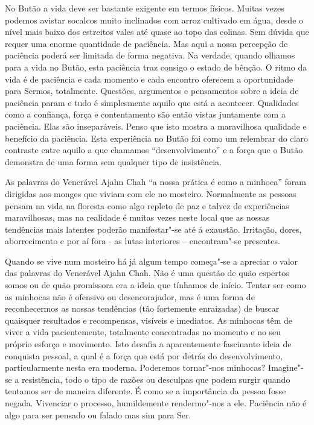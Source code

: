 No Butão a vida deve ser bastante exigente em termos físicos. Muitas
vezes podemos avistar socalcos muito inclinados com arroz cultivado em
água, desde o nível mais baixo dos estreitos vales até quase ao topo das
colinas. Sem dúvida que requer uma enorme quantidade de paciência. Mas
aqui a nossa percepção de paciência poderá ser limitada de forma
negativa. Na verdade, quando olhamos para a vida no Butão, esta
paciência traz consigo o estado de bênção. O ritmo da vida é de
paciência e cada momento e cada encontro oferecem a oportunidade para
Sermos, totalmente. Questões, argumentos e pensamentos sobre a ideia de
paciência param e tudo é simplesmente aquilo que está a acontecer.
Qualidades como a confiança, força e contentamento são então vistas
juntamente com a paciência. Elas são inseparáveis. Penso que isto mostra
a maravilhosa qualidade e benefício da paciência. Esta experiência no
Butão foi como um relembrar do claro contraste entre aquilo a que
chamamos ``desenvolvimento'' e a força que o Butão demonstra de uma
forma sem qualquer tipo de insistência.

As palavras do Venerável Ajahn Chah ``a nossa prática é como a minhoca''
foram dirigidas aos monges que viviam com ele no mosteiro. Normalmente
as pessoas pensam na vida na floresta como algo repleto de paz e talvez
de experiências maravilhosas, mas na realidade é muitas vezes neste
local que as nossas tendências mais latentes poderão manifestar"-se até á
exaustão. Irritação, dores, aborrecimento e por aí fora - as lutas
interiores -- encontram"-se presentes.

Quando se vive num mosteiro há já algum tempo começa"-se a apreciar o
valor das palavras do Venerável Ajahn Chah. Não é uma questão de quão
espertos somos ou de quão promissora era a ideia que tínhamos de início.
Tentar ser como as minhocas não é ofensivo ou desencorajador, mas é uma
forma de reconhecermos as nossas tendências (tão fortemente enraizadas)
de buscar quaisquer resultados e recompensas, visíveis e imediatos. As
minhocas têm de viver a vida pacientemente, totalmente concentradas no
momento e no seu próprio esforço e movimento. Isto desafia a
aparentemente fascinante ideia de conquista pessoal, a qual é a força
que está por detrás do desenvolvimento, particularmente nesta era
moderna. Poderemos tornar"-nos minhocas? Imagine"-se a resistência, todo o
tipo de razões ou desculpas que podem surgir quando tentamos ser de
maneira diferente. É como se a importância da pessoa fosse negada.
Vivenciar o processo, humildemente rendermo"-nos a ele. Paciência não é
algo para ser pensado ou falado mas sim para Ser.

